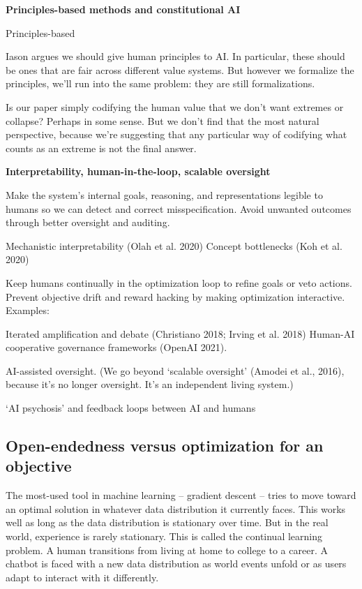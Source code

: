 \textbf{Principles-based methods and constitutional AI}

Principles-based \citep{zhixuan2024beyond, gabriel2020artificial}

Iason argues we should give human principles to AI. In particular, these should be ones that are fair across different value systems. But however we formalize the principles, we'll run into the same problem: they are still formalizations.

Is our paper simply codifying the human value that we don't want extremes or collapse? Perhaps in some sense. But we don't find that the most natural perspective, because we're suggesting that any particular way of codifying what counts as an extreme is not the final answer. 



\textbf{Interpretability, human-in-the-loop, scalable oversight}

Make the system's internal goals, reasoning, and representations legible to humans so we can detect and correct misspecification. Avoid unwanted outcomes through better oversight and auditing.

Mechanistic interpretability (Olah et al. 2020)
Concept bottlenecks (Koh et al. 2020)

Keep humans continually in the optimization loop to refine goals or veto actions. Prevent objective drift and reward hacking by making optimization interactive.
Examples:

Iterated amplification and debate (Christiano 2018; Irving et al. 2018)
Human-AI cooperative governance frameworks (OpenAI 2021).

AI-assisted oversight. (We go beyond `scalable oversight' (Amodei et al., 2016), because it's no longer oversight. It's an independent living system.)

`AI psychosis' \citep{tiku2025psychosis} and feedback loops between AI and humans \citep{dohnany2025technological}



\subsection{Open-endedness versus optimization for an objective}


The most-used tool in machine learning -- gradient descent -- tries to move toward an optimal solution in whatever data distribution it currently faces. This works well as long as the data distribution is stationary over time. But in the real world, experience is rarely stationary. This is called the continual learning problem. A human transitions from living at home to college to a career. A chatbot is faced with a new data distribution as world events unfold or as users adapt to interact with it differently. 

